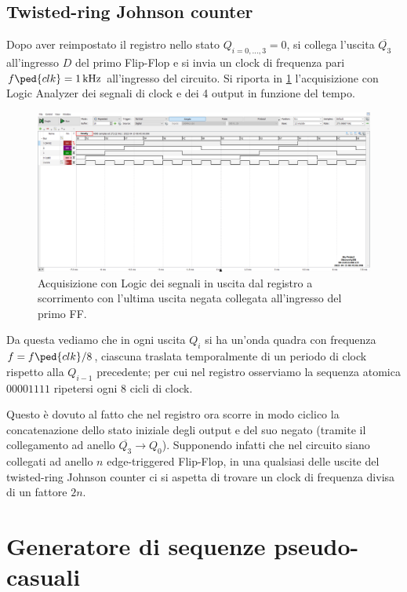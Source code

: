 \documentclass[10pt, a4paper, italian]{article}
\begin{document}
\subsection{Twisted-ring Johnson counter}
Dopo aver reimpostato il registro nello stato $Q_{i=0,\ldots, 3} = 0$, si
collega l'uscita $\overline{Q_3}$ all'ingresso $D$ del primo Flip-Flop e si
invia un clock di frequenza pari $f\ped{clk} = \SI{1}{k\Hz}$ all'ingresso del
circuito. Si riporta in \cref{fig: Shift_reg_seq} l'acquisizione con Logic
Analyzer dei segnali di clock e dei 4 output in funzione del tempo.
\begin{figure}[htbp]
\centering
	\includegraphics[width=\textwidth]{3.e}
	\caption{Acquisizione con Logic dei segnali in uscita dal registro a
	scorrimento con l'ultima uscita negata collegata all'ingresso del primo FF.
	\label{fig: Shift_reg_seq}}
\end{figure}

Da questa vediamo che in ogni uscita $Q_i$ si ha un'onda quadra con frequenza
$f = f\ped{clk}/8$, ciascuna traslata temporalmente di un periodo di clock
rispetto alla $Q_{i-1}$ precedente; per cui nel registro osserviamo la
sequenza atomica $00001111$ ripetersi ogni $8$ cicli di clock.

Questo è dovuto al fatto che nel registro ora scorre in modo ciclico la
concatenazione dello stato iniziale degli output e del suo negato (tramite
il collegamento ad anello $\overline{Q_3} \to Q_0$).
Supponendo infatti che nel circuito siano collegati ad anello $n$
edge-triggered Flip-Flop, in una qualsiasi delle uscite del twisted-ring
Johnson counter ci si aspetta di trovare un clock di frequenza divisa di un
fattore $2n$.

\section{Generatore di sequenze pseudo-casuali}
\end{document}
